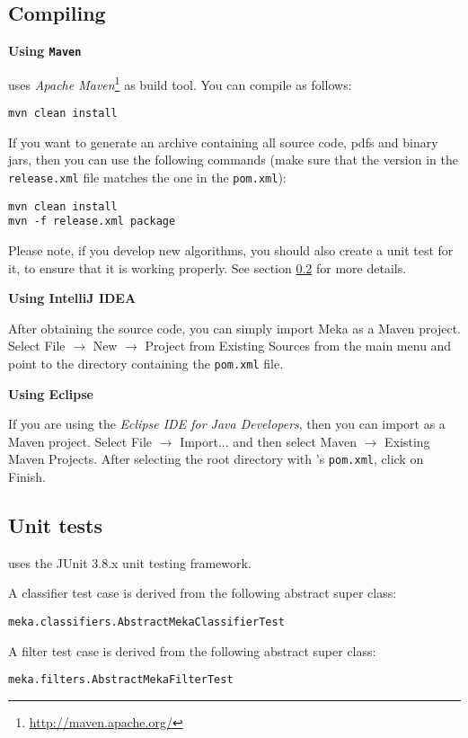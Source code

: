 \documentclass[11pt]{article}
\newcommand{\MEKA}{Meka}
\newcommand{\heading}[1]{
    \vspace{0.3cm} \noindent \textbf{#1} \newline
}
\begin{document}
\subsection{Compiling}
\label{compiling}
\heading{Using \texttt{Maven}}
\framework{\MEKA} uses \textit{Apache Maven}\footnote{\url{http://maven.apache.org/}} as build tool. You can compile \framework{\MEKA} as follows:
\begin{lstlisting}
mvn clean install
\end{lstlisting}
If you want to generate an archive containing all source code, pdfs and binary jars, then you can use the following commands
(make sure that the version in the \texttt{release.xml} file matches the one in the \texttt{pom.xml}):
\begin{lstlisting}
mvn clean install
mvn -f release.xml package
\end{lstlisting}
Please note, if you develop new algorithms, you should also create a unit test for it, to ensure that it is working properly. See section \ref{unittests} for more details.

\heading{Using IntelliJ IDEA}
After obtaining the source code, you can simply import Meka as a Maven project.
Select \textsf{File $\rightarrow$ New $\rightarrow$ Project from Existing Sources} from the main menu and point to
the directory containing the \texttt{pom.xml} file.

\heading{Using Eclipse}
If you are using the \textit{Eclipse IDE for Java Developers}, then you can import as a Maven project.
Select \textsf{File $\rightarrow$ Import...} and then select {Maven $\rightarrow$ Existing Maven Projects}.
After selecting the root directory with \framework{\MEKA}'s \texttt{pom.xml}, click on \textsf{Finish}.

\subsection{Unit tests}
\label{unittests}
\framework{\MEKA} uses the JUnit 3.8.x unit testing framework.

\noindent A classifier test case is derived from the following abstract super class:
\begin{lstlisting}
meka.classifiers.AbstractMekaClassifierTest
\end{lstlisting}

\noindent A filter test case is derived from the following abstract super class:
\begin{lstlisting}
meka.filters.AbstractMekaFilterTest
\end{lstlisting}
\end{document}
